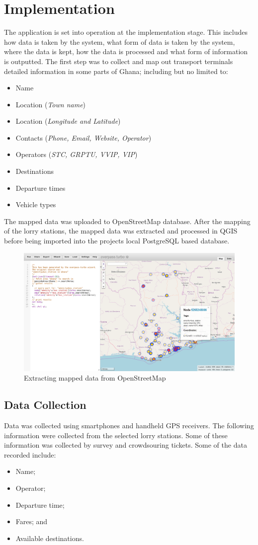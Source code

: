 \section{Implementation}
The application is set into operation at the implementation stage. This includes how data is taken by the system, what form of data is taken by the system, where the data is kept, how the data is processed and what form of information is outputted. The first step was to collect and map out transport terminals detailed information in some parts of Ghana; including but no limited to:
\begin{itemize}
	\item Name
	\item Location (\textit{Town name})
	\item Location (\textit{Longitude and Latitude})
	\item Contacts (\textit{Phone, Email, Website, Operator})
	\item Operators (\textit{STC, GRPTU, VVIP, VIP})
	\item Destinations
	\item Departure times
	\item Vehicle types
\end{itemize}

The mapped data was uploaded to OpenStreetMap database. After the mapping of the lorry stations, the mapped data was extracted and processed in QGIS before being imported into the projects local PostgreSQL based database.

\begin{figure}[H]
	\centering
	\includegraphics[width=0.7\linewidth]{3/figures/overpass}
	\caption[Extracting mapped data from OpenStreetMap]{Extracting mapped data from OpenStreetMap}
	\label{fig:overpass}
\end{figure}


\subsection{Data Collection}
Data was collected using smartphones and handheld GPS receivers. The following information were collected from the selected lorry stations. Some of these information was collected by survey and crowdsouring tickets. Some of the data recorded include:
\begin{itemize}
	\item Name;
	\item Operator;
	\item Departure time;
	\item Fares; and 
	\item Available destinations.
\end{itemize}

